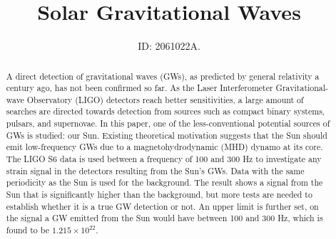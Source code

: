 \documentclass[12pt,helvetica,a4paper,final]{iopart}
\begin{document}
\maketitle
 
\title[Solar Gravitational Waves]{Solar Gravitational Waves}
\author{ID: 2061022A. {}}
\address{School of Physics and Astronomy, University of Glasgow}

\begin{abstract}

A direct detection of gravitational waves (GWs), as predicted by general relativity a century ago, has not been confirmed so far. As the Laser Interferometer Gravitational-wave Observatory (LIGO) detectors reach better sensitivities, a large amount of searches are directed towards detection from sources such as compact binary systems, pulsars, and supernovae. In this paper, one of the less-conventional potential sources of GWs is studied: our Sun. Existing theoretical motivation suggests that the Sun should emit low-frequency GWs due to a magnetohydrodynamic (MHD) dynamo at its core. The LIGO S6 data is used between a frequency of 100 and 300 Hz to investigate any strain signal in the detectors resulting from the Sun's GWs. Data with the same periodicity as the Sun is used for the background. The result shows a signal from the Sun that is significantly higher than the background, but more tests are needed to establish whether it is a true GW detection or not. An upper limit is further set, on the signal a GW emitted from the Sun would have between 100 and 300 Hz, which is found to be $1.215 \times 10^{22}$. 


\end{abstract}



\end{document}
